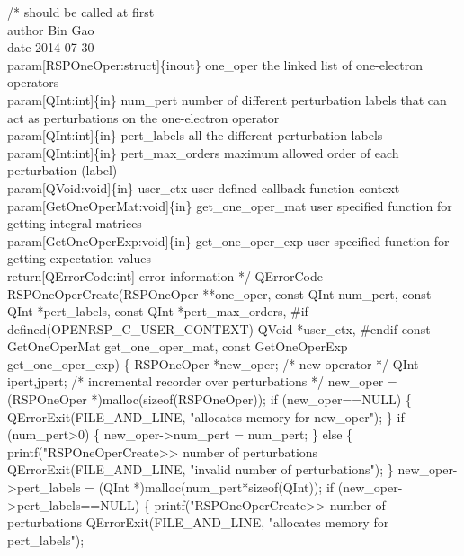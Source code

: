 /*%
        should be called at first
    \\author Bin Gao
    \\date 2014-07-30
    \\param[RSPOneOper:struct]\{inout\} one_oper the linked list of one-electron operators
    \\param[QInt:int]\{in\} num_pert number of different perturbation labels that can
        act as perturbations on the one-electron operator
    \\param[QInt:int]\{in\} pert_labels all the different perturbation labels
    \\param[QInt:int]\{in\} pert_max_orders maximum allowed order of each perturbation (label)
    \\param[QVoid:void]\{in\} user_ctx user-defined callback function context
    \\param[GetOneOperMat:void]\{in\} get_one_oper_mat user specified function for
        getting integral matrices
    \\param[GetOneOperExp:void]\{in\} get_one_oper_exp user specified function for
        getting expectation values
    \\return[QErrorCode:int] error information
*/
QErrorCode RSPOneOperCreate(RSPOneOper **one_oper,
                            const QInt num_pert,
                            const QInt *pert_labels,
                            const QInt *pert_max_orders,
#if defined(OPENRSP_C_USER_CONTEXT)
                            QVoid *user_ctx,
#endif
                            const GetOneOperMat get_one_oper_mat,
                            const GetOneOperExp get_one_oper_exp)
\{
    RSPOneOper *new_oper;  /* new operator */
    QInt ipert,jpert;      /* incremental recorder over perturbations */
    new_oper = (RSPOneOper *)malloc(sizeof(RSPOneOper));
    if (new_oper==NULL) \{
        QErrorExit(FILE_AND_LINE, "allocates memory for new_oper");
    \}
    if (num_pert>0) \{
        new_oper->num_pert = num_pert;
    \}
    else \{
        printf("RSPOneOperCreate>> number of perturbations %
        QErrorExit(FILE_AND_LINE, "invalid number of perturbations");
    \}
    new_oper->pert_labels = (QInt *)malloc(num_pert*sizeof(QInt));
    if (new_oper->pert_labels==NULL) \{
        printf("RSPOneOperCreate>> number of perturbations %
        QErrorExit(FILE_AND_LINE, "allocates memory for pert_labels");
